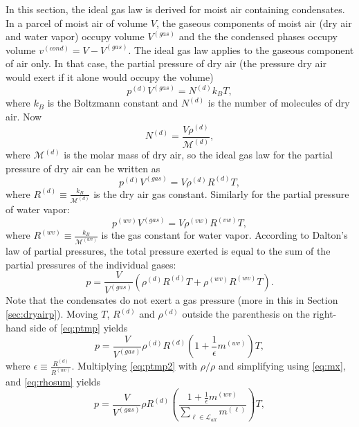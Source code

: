 \documentclass{agujournal}
\begin{document}
{In this section, the ideal gas law is derived for moist air containing condensates. In a parcel of moist air
of volume $V$, the gaseous components of moist air (dry air and water vapor) occupy volume $V^{(gas)}$ and the the condensed phases occupy volume $v^{(cond)}=V-V^{(gas)}$. The ideal gas law applies to the gaseous component of air only. In that case, the partial pressure of dry air (the pressure dry air would exert if it alone would occupy the volume)
\begin{equation}
p^{(d)}V^{(gas)}=N^{(d)}k_B T,
\end{equation}
where $k_B$ is the Boltzmann constant and $N^{(d)}$ is the number of molecules of dry air. Now
\begin{equation}
N^{(d)}=\frac{V \rho^{(d)}}{\mathcal{M}^{(d)}},
\end{equation}
where $\mathcal{M}^{(d)}$ is the molar mass of dry air, so the ideal gas law for the partial pressure of dry air can be written as
\begin{equation}
p^{(d)}V^{(gas)}=V\rho^{(d)}R^{(d)}T,
\end{equation}
where $R^{(d)}\equiv \frac{k_B}{\mathcal{M}^{(d)}}$ is the dry air gas constant. Similarly for the partial pressure of water vapor:
\begin{equation}
p^{(wv)}V^{(gas)}=V\rho^{(vw)}R^{(vw)}T,
\end{equation}
where $R^{(wv)}\equiv \frac{k_B}{\mathcal{M}^{(wv)}}$ is the gas constant for water vapor. According to Dalton's law of partial pressures, the total pressure exerted is equal to the sum of the partial pressures of the individual gases:
\begin{equation}
\label{eq:ptmp}
p=\frac{V}{V^{(gas)}}\left( \rho^{(d)}R^{(d)}T+\rho^{(wv)}R^{(wv)}T\right).
\end{equation}
Note that the condensates do not exert a gas pressure (more in this in Section \ref{sec:dryairp}). Moving $T$, $R^{(d)}$ and $\rho^{(d)}$ outside the parenthesis on the right-hand side of \eqref{eq:ptmp} yields
\begin{equation}
\label{eq:ptmp2}
p=\frac{V}{V^{(gas)}}\rho^{(d)}R^{(d)}\left( 1+\frac{1}{\epsilon}m^{(wv)}\right)T,
\end{equation}
where $\epsilon\equiv \frac{R^{(d)}}{R^{(wv)}}$. Multiplying \eqref{eq:ptmp2} with $\rho/\rho$ and simplifying using \eqref{eq:mx}, and \eqref{eq:rhosum} yields
\begin{equation}
\label{eq:ptmp3}
p=\frac{V}{V^{(gas)}}\rho R^{(d)}\left(\frac{ 1+\frac{1}{\epsilon}m^{(wv)}}{\sum_{\ell \in \mathcal{L}_{all}}m^{(\ell)}}\right)T,

\end{equation}}
\end{document}
